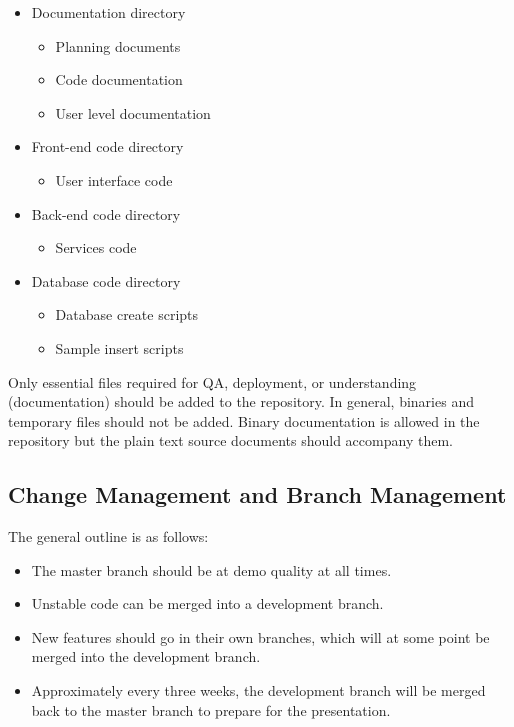 \documentclass{article}
\begin{document}
	\begin{itemize}
		\item{Documentation directory
			\begin{itemize}
				\item{Planning documents}
				\item{Code documentation}
				\item{User level documentation}
			\end{itemize}
		}
		\item{Front-end code directory
			\begin{itemize}
				\item{User interface code}
			\end{itemize}
		}
		\item{Back-end code directory
			\begin{itemize}
				\item{Services code}
			\end{itemize}
		}
		\item{Database code directory
			\begin{itemize}
				\item{Database create scripts}
				\item{Sample insert scripts}
			\end{itemize}
		}
	\end{itemize}

	Only essential files required for QA, deployment, or understanding (documentation) should be added to the repository. In general, binaries and temporary files should not be added. Binary documentation is allowed in the repository but the plain text source documents should accompany them.

	\subsection{Change Management and Branch Management}

	The general outline is as follows:
	\begin{itemize}
		\item{The master branch should be at demo quality at all times.}
		\item{Unstable code can be merged into a development branch.}
		\item{New features should go in their own branches, which will at some point be merged into the development branch.}
		\item{Approximately every three weeks, the development branch will be merged back to the master branch to prepare for the presentation.}
	\end{itemize}
\end{document}
